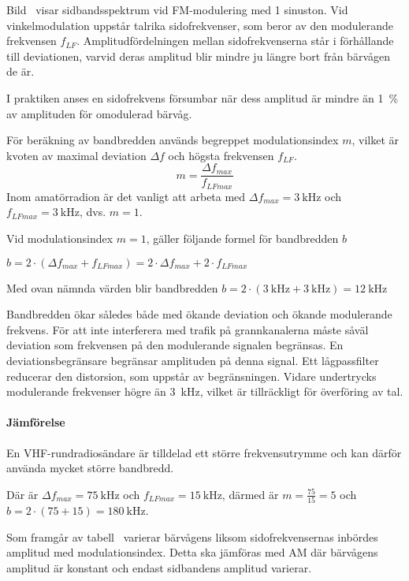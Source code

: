 Bild~ visar sidbandsspektrum vid FM-moduler\-ing med 1
sinuston.
Vid vinkelmodulation uppstår talrika sidofrekvenser, som beror av den
modulerande frekvensen \(f_{LF}\).
Amplitudfördelningen mellan sidofrekvenserna står i förhållande till
deviationen, varvid deras amplitud blir mindre ju längre bort från bärvågen
de är.

I praktiken anses en sidofrekvens försumbar när dess amplitud är mindre än 1~\%
av amplituden för omodulerad bärvåg.

För beräkning av bandbredden används begreppet modulationsindex \(m\), vilket är
kvoten av maximal deviation \(\Delta f\) och högsta frekvensen \(f_{LF}\).
\[m = \dfrac{\Delta f_{max}}{f_{LFmax}}\]
Inom amatörradion är det vanligt att arbeta med \(\Delta f_{max} =
\qty{3}{\kilo\hertz}\) och \(f_{LFmax} = \qty{3}{\kilo\hertz}\), dvs. \(m = 1\).

Vid modulationsindex \(m = 1\), gäller följande formel för bandbredden \(b\)

\medskip
\(b = 2 \cdot ( \Delta f_{max} + f_{LFmax}) = 2 \cdot \Delta f_{max}
 + 2 \cdot f_{LFmax}\)
 \medskip
 
Med ovan nämnda värden blir bandbredden \(b = 2 \cdot (\qty{3}{\kilo\hertz} +
\qty{3}{\kilo\hertz}) = \qty{12}{\kilo\hertz}\)

Bandbredden ökar således både med ökande deviation och ökande modulerande
frekvens.
För att inte interferera med trafik på grannkanalerna måste såväl deviation som
frekvensen på den modulerande signalen begränsas.
En deviationsbegränsare begränsar amplituden på denna signal.
Ett lågpassfilter reducerar den distorsion, som uppstår av begränsningen.
Vidare undertrycks modulerande frekvenser högre än \qty{3}{\kilo\hertz}, vilket
är tillräckligt för överföring av tal.

\paragraph{Jämförelse}

En VHF-rundradiosändare är tilldelad ett större frekvensutrymme och kan därför
använda mycket större bandbredd.

Där är \(\Delta f_{max} = \qty{75}{\kilo\hertz}\) och \(f_{LFmax} =
\qty{15}{\kilo\hertz}\), därmed är \(m = \frac{75}{15} = 5\) och \(b = 2 \cdot
(75 + 15) = \qty{180}{\kilo\hertz}\).

Som framgår av tabell~ varierar bärvågens liksom
sidofrekvensernas inbördes amplitud med modulationsindex.
Detta ska jämföras med AM där bärvågens amplitud är konstant och endast
sidbandens amplitud varierar.

